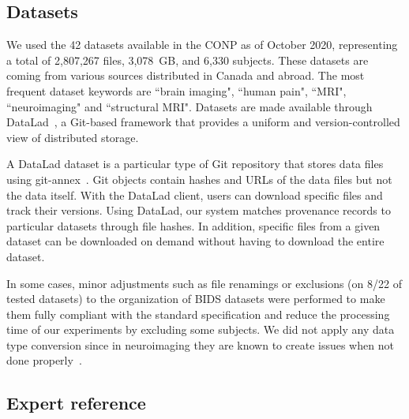 \subsection{Datasets} 

We used the 42 datasets available in the CONP as of October 2020,
representing a total of 2,807,267 files, 3,078~GB, and 6,330 subjects.
These datasets are coming from various sources distributed in Canada and abroad. The most frequent dataset keywords are ``brain imaging", ``human pain", ``MRI", ``neuroimaging" and ``structural MRI".
 Datasets are made available through DataLad~\cite{datalad2021},
a Git-based framework that provides a uniform and version-controlled view of
distributed storage.

A DataLad dataset is a particular type of Git repository that stores
 data files using git-annex~\cite{gitannex}. Git objects contain
hashes and URLs of the data files but not the data itself. With the DataLad
client, users can download specific files and track their versions. Using
DataLad, our system matches provenance records to particular datasets
through file hashes. In addition, specific files from a given dataset can
be downloaded on demand without having to download the entire dataset. 

 In some cases, minor adjustments such as file renamings or exclusions (on 8/22 of tested datasets) to the organization of BIDS datasets were performed to make them fully compliant with the standard specification and reduce the processing time of our experiments by excluding some subjects. We did not apply any data type conversion since in neuroimaging they are known to create issues when not done properly~\cite{li2016first}. 



\subsection{Expert reference}

